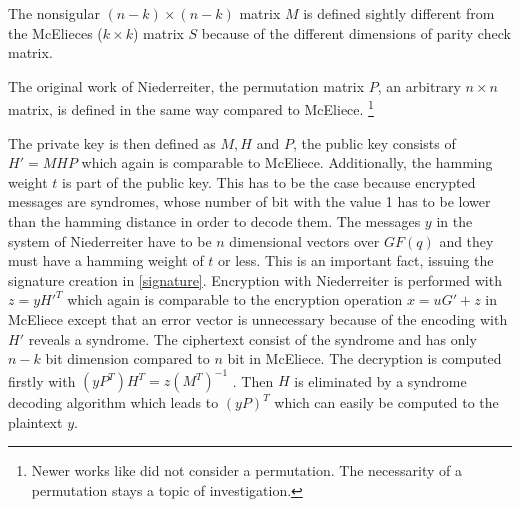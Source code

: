 The nonsigular $(n - k) \times (n - k)$ matrix $M$ is defined sightly different from the McElieces ($k \times k$) matrix $S$ because of the different dimensions of parity check matrix. 

The original work of Niederreiter, the permutation matrix $P$, an arbitrary $n \times n$ matrix, is defined in the same way compared to McEliece. \footnote{Newer works like \cite[P. 69ff]{baldi2014qc} did not consider a permutation. The necessarity of a permutation stays a topic of investigation.} 


The private key is then defined as $M, H$ and $P$, the public key consists of $H' = MHP$ which again is comparable to McEliece. Additionally, the hamming weight $t$ is part of the public key. This has to be the case because encrypted messages are syndromes, whose  number of bit with the value 1 has to be lower than the hamming distance in order to decode them.
\newline
The messages $y$ in the system of Niederreiter have to be $n$ dimensional vectors over $GF(q)$ and they must have a hamming weight of $t$ or less. This is an important fact, issuing the signature creation in \autoref{signature}.
Encryption with Niederreiter is performed with $z = yH'^T$ which again is comparable to the encryption operation $x = uG' + z$ in McEliece except that an error vector is unnecessary because of the encoding with $H'$ reveals a syndrome. The ciphertext consist of the syndrome and has only $n - k$ bit dimension compared to $n$ bit in McEliece. 
\newline
The decryption is computed firstly with $(yP^T)H^T = z(M^T)^{-1}$ . Then $H$ is eliminated by a syndrome decoding algorithm \cite[P. 332ff]{macwilliams1977theory} which leads to $(yP)^T$ which can  easily be computed to the plaintext $y$. \cite{sendrier2011niederreiter}\cite{li1994equivalence}\cite{niederreiter1986knapsack}



